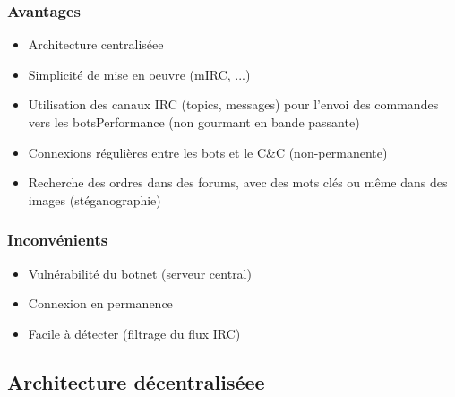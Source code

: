 \subsubsection{Avantages}
\begin{itemize}
	\item Architecture  centraliséee
	\item Simplicité de mise en oeuvre (mIRC, ...)
	\item Utilisation des canaux IRC (topics, messages) pour l’envoi des commandes vers les botsPerformance (non gourmant en bande passante)
	\item Connexions régulières entre les bots et le C\&C (non-permanente)
	\item Recherche des ordres dans des forums, avec des mots clés ou même dans des images (stéganographie)
\end{itemize}

\subsubsection{Inconvénients}
\begin{itemize}
	\item Vulnérabilité du botnet (serveur central)
	\item Connexion en permanence
	\item Facile à détecter (filtrage du flux IRC)
\end{itemize}









\subsection{Architecture décentraliséee}

